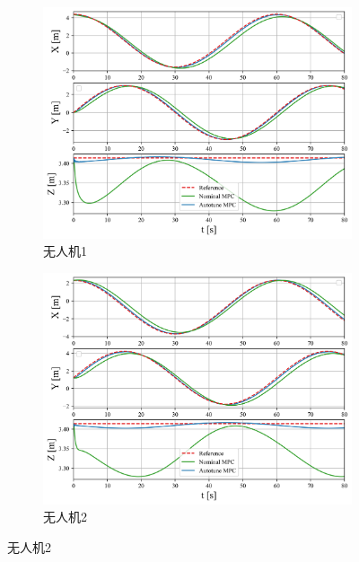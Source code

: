 \documentclass[lang=chs, degree=master, blindreview=true, winfonts=true]{yanputhesis}
\begin{document}
\begin{figure}[hbt!]
    \centering
    \begin{subfigure}[b]{0.48\textwidth}
        \centering
        \includegraphics[width=\textwidth]{picture/kk2/quadrotor0.png}
        \caption{无人机1}
        \label{quadrotor0}
    \end{subfigure}
    \hfill
    \begin{subfigure}[b]{0.48\textwidth}
        \centering
        \includegraphics[width=\textwidth]{picture/kk2/quadrotor1.png}
        \caption{无人机2}
        \label{quadrotor1}
    \end{subfigure}
    
    \vspace{0.5cm} %
    

\end{figure}
\end{document}
